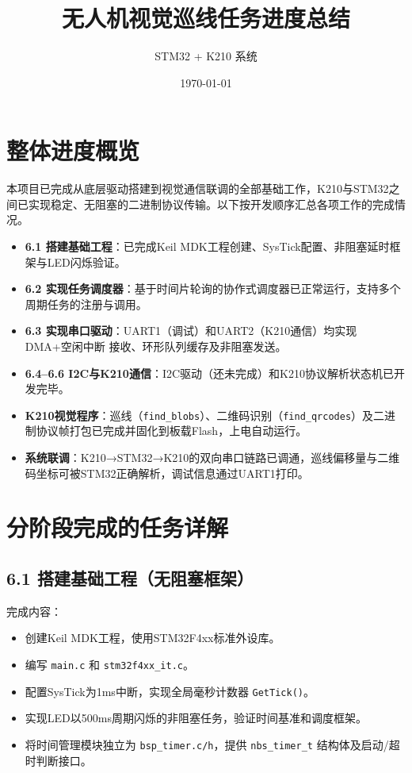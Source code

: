 \documentclass{article}
\title{无人机视觉巡线任务进度总结}
\author{STM32 + K210 系统}
\date{\today}
\begin{document}
\maketitle

\section{整体进度概览}

本项目已完成从底层驱动搭建到视觉通信联调的全部基础工作，K210与STM32之间已实现稳定、无阻塞的二进制协议传输。以下按开发顺序汇总各项工作的完成情况。

\begin{itemize}
    \item \textbf{6.1 搭建基础工程}：已完成Keil MDK工程创建、SysTick配置、非阻塞延时框架与LED闪烁验证。
    \item \textbf{6.2 实现任务调度器}：基于时间片轮询的协作式调度器已正常运行，支持多个周期任务的注册与调用。
    \item \textbf{6.3 实现串口驱动}：UART1（调试）和UART2（K210通信）均实现 DMA+空闲中断 接收、环形队列缓存及非阻塞发送。
    \item \textbf{6.4--6.6 I2C与K210通信}：I2C驱动（还未完成）和K210协议解析状态机已开发完毕。
    \item \textbf{K210视觉程序}：巡线（\texttt{find\_blobs}）、二维码识别（\texttt{find\_qrcodes}）及二进制协议帧打包已完成并固化到板载Flash，上电自动运行。
    \item \textbf{系统联调}：K210→STM32→K210的双向串口链路已调通，巡线偏移量与二维码坐标可被STM32正确解析，调试信息通过UART1打印。
\end{itemize}

\section{分阶段完成的任务详解}

\subsection{6.1 搭建基础工程（无阻塞框架）}
完成内容：
\begin{itemize}
    \item 创建Keil MDK工程，使用STM32F4xx标准外设库。
    \item 编写 \texttt{main.c} 和 \texttt{stm32f4xx\_it.c}。
    \item 配置SysTick为1ms中断，实现全局毫秒计数器 \texttt{GetTick()}。
    \item 实现LED以500ms周期闪烁的非阻塞任务，验证时间基准和调度框架。
    \item 将时间管理模块独立为 \texttt{bsp\_timer.c/h}，提供 \texttt{nbs\_timer\_t} 结构体及启动/超时判断接口。
\end{itemize}
\end{document}
